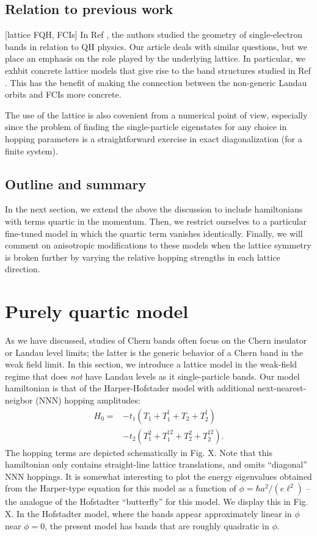 \documentclass[aps,prb,twocolumn,letterpaper,twoside,nobalancelastpage,groupedaddress,amsmath,amssymb,floatfix,citeautoscript]{revtex4-1}
\begin{document}
\subsection{Relation to previous work}
[lattice FQH, FCIs]\cite{}
In Ref , the authors studied the geometry of single-electron bands in relation to QH physics. Our article deals with similar questions, but we place an emphasis on the role played by the underlying lattice. In particular, we exhbit concrete lattice models that give rise to the band structures studied in Ref . This has the benefit of making the connection between the non-generic Landau orbits and FCIs more concrete.

The use of the lattice is also covenient from a numerical point of view, especially since the problem of finding the single-particle eigenstates for any choice in hopping parameters is a straightforward exercise in exact diagonalization (for a finite system).

\subsection{Outline and summary}
In the next section, we extend the above the discussion to include hamiltonians with terms quartic in the momentum. Then, we restrict ourselves to a particular fine-tuned model in which the quartic term vanishes identically. Finally, we will comment on anisotropic modifications to these models when the lattice symmetry is broken further by varying the relative hopping strengths in each lattice direction.

\section{Purely quartic model}
As we have discussed, studies of Chern bands often focus on the Chern insulator or Landau level limits; the latter is the generic behavior of a Chern band in the weak field limit. In this section, we introduce a lattice model in the weak-field regime that does \textit{not} have Landau levels as it single-particle bands. Our model hamiltonian is that of the Harper-Hofstader model with additional next-nearest-neigbor (NNN) hopping amplitudes:
\begin{align*}
H_0 = &-t_1 \left(T_1 + T_1^{\dag} + T_2 + T_2^{\dag}\right)\\ &- t_2 \left(T_1^{2} + T_1^{\dag 2} + T_2^{2} + T_2^{\dag 2}\right).
\end{align*}
{}
The hopping terms are depicted schematically in Fig. X. Note that this hamiltonian only contains straight-line lattice translations, and omits ``diagonal'' NNN hoppings. It is somewhat interesting to plot the energy eigenvalues obtained from the Harper-type equation for this model as a function of $\phi = \hbar a^2/(e \ell^2)$ -- the analogue of the Hofstadter ``butterfly'' for this model. We display this in Fig. X. In the Hofstadter model, where the bands appear approximately linear in $\phi$ near $\phi =0$, the present model has bands that are roughly quadratic in $\phi$. 
\end{document}

